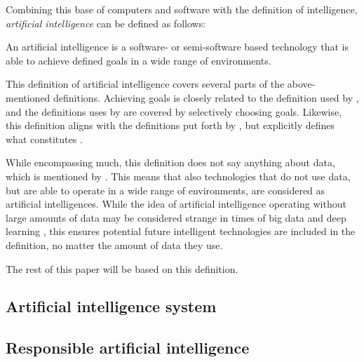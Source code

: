 Combining this base of computers and software with the definition of intelligence, \textit{artificial intelligence} can be defined as follows:
\begin{displayquote}
    An artificial intelligence is a software- or semi-software based technology that is able to achieve defined goals in a wide range of environments.
\end{displayquote}

This definition of artificial intelligence covers several parts of the above-mentioned definitions. Achieving goals is closely related to the definition used by \textcite{Mikalef_2022}, and the definitions uses by \textcite{Brand_2022,Havrda_2020} are covered by selectively choosing goals. Likewise, this definition aligns with the definitions put forth by \textcite{Liu_2021,vanBruxvoort_2021}, but explicitly defines what constitutes .

While encompassing much, this definition does not say anything about data, which is mentioned by \textcite{Mikalef_2022,Dignum_2021}. This means that also technologies that do not use data, but are able to operate in a wide range of environments, are considered as artificial intelligences. While the idea of artificial intelligence operating without large amounts of data may be considered strange in times of big data \parencite{Singh_2022} and deep learning \parencite{Lecun_2015}, this ensures potential future intelligent technologies are included in the definition, no matter the amount of data they use.

The rest of this paper will be based on this definition.


\subsection{Artificial intelligence system}

\subsection{Responsible artificial intelligence}
